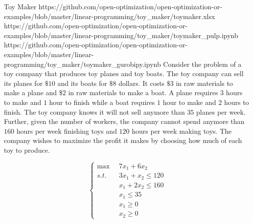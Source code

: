 \documentclass{article}
\begin{document}
\begin{figure}[H]
\begin{subfigure}{.3\textwidth}
\begin{center}
    \end{center}
\end{subfigure}

\end{figure}


\begin{examplewithallcode}{Toy Maker}
{https://github.com/open-optimization/open-optimization-or-examples/blob/master/linear-programming/toy_maker/toymaker.xlsx}
{https://github.com/open-optimization/open-optimization-or-examples/blob/master/linear-programming/toy_maker/toymaker_pulp.ipynb}
{https://github.com/open-optimization/open-optimization-or-examples/blob/master/linear-programming/toy_maker/toymaker_gurobipy.ipynb}
Consider the problem of a toy company that produces toy planes and toy boats. The toy company can sell its planes for $\$10$ and its boats for $\$8$ dollars. It costs $\$3$ in raw materials to make a plane and $\$2$ in raw materials to make a boat. A plane requires $3$ hours to make and $1$ hour to finish while a boat requires $1$ hour to make and $2$ hours to finish. The toy company knows it will not sell anymore than $35$ planes per week. Further, given the number of workers, the company cannot spend anymore than $160$ hours per week finishing toys and $120$ hours per week making toys. The company wishes to maximize the profit it makes by choosing how much of each toy to produce. 

\begin{equation}
\left\{
\begin{aligned}
\max\;\;& 7x_1 + 6x_2\\
s.t.\;\;&  3x_1 + x_2 \leq 120\\
& x_1 + 2x_2 \leq 160\\
& x_1 \leq 35\\
& x_1 \geq 0\\
& x_2 \geq 0
\end{aligned}
\right.
\label{eqn:ToyMakerEx}
\end{equation}
\label{ex:ToyMaker}
\end{examplewithallcode}
\end{document}
